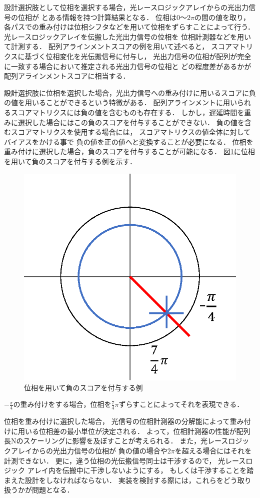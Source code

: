 設計選択肢として位相を選択する場合，光レースロジックアレイからの光出力信号の位相が
とある情報を持つ計算結果となる．
位相は$0〜2\pi$の間の値を取り，
各パスでの重み付けは位相シフタなどを用いて位相をずらすことによって行う．
光レースロジックアレイを伝搬した光出力信号の位相を
位相計測器などを用いて計測する．
配列アラインメントスコアの例を用いて述べると，
スコアマトリクスに基づく位相変化を光伝搬信号に付与し，
光出力信号の位相が配列が完全に一致する場合において推定される光出力信号の位相と
どの程度差があるかが配列アラインメントスコアに相当する．

設計選択肢に位相を選択した場合，光出力信号への重み付けに用いるスコアに負の値を用いることができるという特徴がある．
配列アラインメントに用いられるスコアマトリクスには負の値を含むものも存在する．
しかし，遅延時間を重みに選択した場合にはこの負のスコアを付与することができない．
負の値を含むスコアマトリクスを使用する場合には，
スコアマトリクスの値全体に対してバイアスをかける事で
負の値を正の値へと変換することが必要になる．
位相を重み付けに選択した場合，負のスコアを付与することが可能になる．
図\ref{fig:isou}に位相を用いて負のスコアを付与する例を示す．
\begin{figure}[t!]
\begin{center}
\includegraphics[keepaspectratio,scale=0.5]{fig/5/isou.eps}
\caption{位相を用いて負のスコアを付与する例}
\label{fig:isou}
\end{center}
\end{figure}
$-\frac{\pi}{4}$の重み付けをする場合，位相を$\frac{7}{4}\pi$ずらすことによってそれを表現できる．

位相を重み付けに選択した場合，
光信号の位相計測器の分解能によって重み付けに用いる位相差の最小単位が決定される．
よって，位相計測器の性能が配列長Nのスケーリングに影響を及ぼすことが考えられる．
また，光レースロジックアレイからの光出力信号の位相が
負の値の場合や$2\pi$を超える場合にはそれを計測できない．
更に，違う位相の光伝搬信号同士は干渉するので，
光レースロジック アレイ内を伝搬中に干渉しないようにする，
もしくは干渉することを踏まえた設計をしなければならない．
実装を検討する際には，これらをどう取り扱うかが問題となる．
